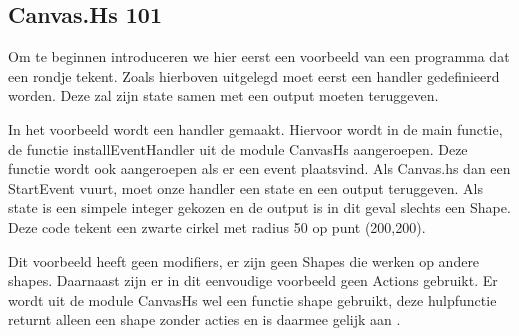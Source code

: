 \subsection{Canvas.Hs 101}
Om te beginnen introduceren we hier eerst een voorbeeld van een programma dat een rondje tekent. Zoals hierboven uitgelegd moet eerst een handler gedefinieerd worden. Deze zal zijn state samen met een output moeten teruggeven.



In het voorbeeld wordt een handler gemaakt. Hiervoor wordt in de main functie, de functie installEventHandler uit de module CanvasHs aangeroepen. Deze functie wordt ook aangeroepen als er een event plaatsvind. Als Canvas.hs dan een StartEvent vuurt, moet onze handler een state en een output teruggeven. Als state is een simpele integer gekozen en de output is in dit geval slechts een Shape. Deze code tekent een zwarte cirkel met radius 50 op punt (200,200).

Dit voorbeeld heeft geen modifiers, er zijn geen Shapes die werken op andere shapes. Daarnaast zijn er in dit eenvoudige voorbeeld geen Actions gebruikt. Er wordt uit de module CanvasHs wel een functie shape gebruikt, deze hulpfunctie returnt alleen een shape zonder acties en is daarmee gelijk aan .
